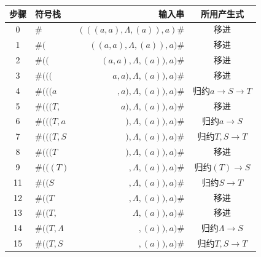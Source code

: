 \documentclass{article}
\begin{document}
\begin{center}
    \setlength{\abovedisplayskip}{0pt}
    \begin{longtable}{|c|l|r|c|}\hline
        \setlength{\belowdisplayskip}{0pt}
        步骤 & 符号栈          & 输入串                      & 所用产生式                           \\\hline
        0    & $\#$            & $(((a,a),\Lambda,(a)),a)\#$ & 移进                                 \\\hline
        1    & $\#($           & $((a,a),\Lambda,(a)),a)\#$  & 移进                                 \\\hline
        2    & $\#(($          & $(a,a),\Lambda,(a)),a)\#$   & 移进                                 \\\hline
        3    & $\#((($         & $a,a),\Lambda,(a)),a)\#$    & 移进                                 \\\hline
        4    & $\#(((a$        & $,a),\Lambda,(a)),a)\#$     & 归约$a\rightarrow S \rightarrow T$   \\\hline
        5    & $\#(((T,$       & $a),\Lambda,(a)),a)\#$      & 移进                                 \\\hline
        6    & $\#(((T,a$      & $),\Lambda,(a)),a)\#$       & 归约$a\rightarrow S$                 \\\hline
        7    & $\#(((T,S$      & $),\Lambda,(a)),a)\#$       & 归约$T,S\rightarrow T$               \\\hline
        8    & $\#(((T$        & $),\Lambda,(a)),a)\#$       & 移进                                 \\\hline
        9    & $\#(((T)$       & $,\Lambda,(a)),a)\#$        & 归约$(T)\rightarrow S$               \\\hline
        11   & $\#((S$         & $,\Lambda,(a)),a)\#$        & 归约$S\rightarrow T$                 \\\hline
        12   & $\#((T$         & $,\Lambda,(a)),a)\#$        & 移进                                 \\\hline
        13   & $\#((T,$        & $\Lambda,(a)),a)\#$         & 移进                                 \\\hline
        14   & $\#((T,\Lambda$ & $,(a)),a)\#$                & 归约$\Lambda \rightarrow S $         \\\hline
        15   & $\#((T,S$       & $,(a)),a)\#$                & 归约$T,S\rightarrow T$               \\\hline

\end{longtable}
\end{center}
\end{document}
